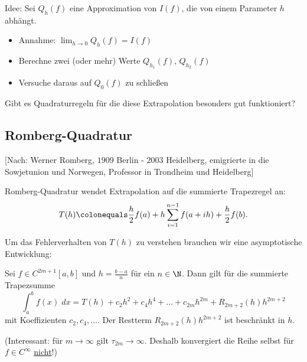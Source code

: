 Idee: Sei $Q_h(f)$ eine Approximation von $I(f)$, die von einem Parameter $h$ abhängt.
\begin{itemize}
\item Annahme: $\lim_{h \to 0} Q_h(f) = I(f)$
\item Berechne zwei (oder mehr) Werte $Q_{h_1}(f)$, $Q_{h_2}(f)$
\item Versuche daraus auf $Q_0(f)$ zu schließen
\begin{center}
\end{center}
\end{itemize}

Gibt es Quadraturregeln für die diese Extrapolation besonders gut funktioniert?

\subsection{Romberg-Quadratur}

[Nach: Werner Romberg, $1909$ Berlin - $2003$ Heidelberg, emigrierte in die Sowjetunion und Norwegen, Professor in Trondheim und Heidelberg]

\bigskip

Romberg-Quadratur wendet Extrapolation auf die summierte Trapezregel an:
\begin{equation*}
T(h) \colonequals \frac{h}{2} f(a) + h \sum_{i=1}^{n -1} f(a+ ih) + \frac{h}{2} f(b).
\end{equation*}

Um das Fehlerverhalten von $T(h)$ zu verstehen brauchen wir eine asymptotische Entwicklung:
\begin{satz}
Sei $f \in C^{2m+1}[a,b]$ und $h = \frac{b-a}{n}$ für ein $n \in \N$. Dann gilt für die summierte Trapezsumme
\begin{equation*}
\int_a^b f(x)\;dx = T(h) + c_2h^2 + c_4h^4  + \dots + c_{2m}h^{2m}  + R_{2m+2}(h) h^{2m+2}
\end{equation*}
mit Koeffizienten $c_2, c_4, \dots$.
Der Restterm $R_{2m+2}(h) h^{2m+2}$ ist beschränkt in $h$.
\end{satz}
(Interessant: für $m\to \infty$ gilt $\tau_{2m} \to \infty$. Deshalb konvergiert die Reihe
selbst für $f \in C^\infty$ \underline{nicht}!)

